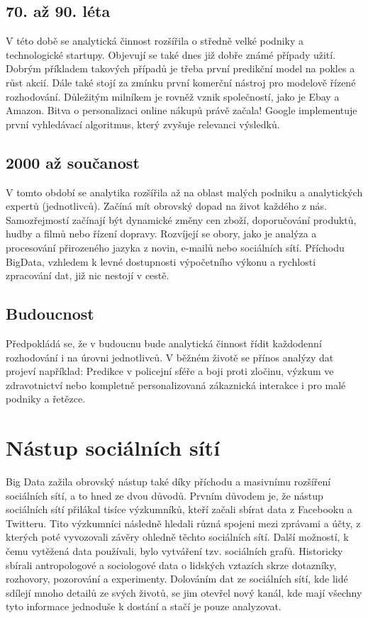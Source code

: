 \subsection{70. až 90. léta}
V této době se analytická činnost rozšířila o středně velké podniky a technologické startupy. Objevují se také dnes již dobře známé případy užití. Dobrým příkladem takových případů je třeba první predikční model na pokles a růst akcií. Dále také stojí za zmínku první komerční nástroj pro modelově řízené rozhodování. Důležitým milníkem je rovněž vznik společností, jako je Ebay a Amazon. Bitva o personalizaci online nákupů právě začala! Google implementuje první vyhledávací algoritmus, který zvyšuje relevanci výsledků.

\subsection{2000 až součanost}
V tomto období se analytika rozšířila až na oblast malých podniku a analytických expertů (jednotlivců). Začíná mít obrovský dopad na život každého z nás. Samozřejmostí začínají být dynamické změny cen zboží, doporučování produktů, hudby a filmů nebo řízení dopravy. Rozvíjejí se obory, jako je analýza a procesování přirozeného jazyka z novin, e-mailů nebo sociálních sítí. Příchodu BigData, vzhledem k levné dostupnosti výpočetního výkonu a rychlosti zpracování dat, již nic nestojí v cestě.

\subsection{Budoucnost}
Předpokládá se, že v budoucnu bude analytická činnost řídit každodenní rozhodování i na úrovni jednotlivců. V běžném životě se přínos analýzy dat projeví například: Predikce v policejní sféře a boji proti zločinu, výzkum ve zdravotnictví nebo kompletně personalizovaná zákaznická interakce i pro malé podniky a řetězce. %

\section{Nástup sociálních sítí}
Big Data zažila obrovský nástup také díky příchodu a masivnímu rozšíření sociálních sítí, a to hned ze dvou důvodů. Prvním důvodem je, že nástup sociálních sítí přilákal tisíce výzkumníků, kteří začali sbírat data z Facebooku a Twitteru. Tito výzkumníci následně hledali různá spojeni mezi zprávami a účty, z kterých poté vyvozovali závěry ohledně těchto sociálních sítí. Další možností, k čemu vytěžená data používali, bylo vytváření tzv. sociálních grafů. Historicky sbírali antropologové a sociologové data o lidských vztazích skrze dotazníky, rozhovory, pozorování a experimenty. Dolováním dat ze sociálních sítí, kde lidé sdílejí mnoho detailů ze svých životů, se jim otevřel nový kanál, kde mají všechny tyto informace jednoduše k dostání a stačí je pouze analyzovat.

